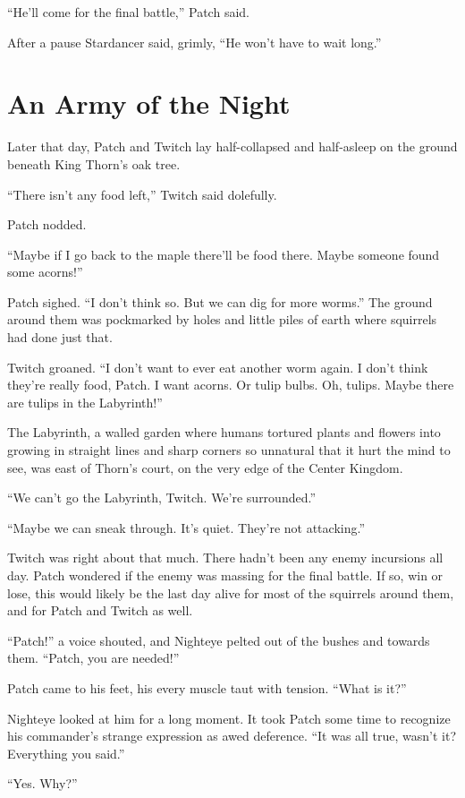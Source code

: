 \documentclass[12pt]{memoir}
\begin{document}
“He’ll come for the final battle,” Patch said.

After a pause Stardancer said, grimly, “He won’t have to wait long.”


\section{An Army of the Night}

Later that day, Patch and Twitch lay half-collapsed and half-asleep on
the ground beneath King Thorn’s oak tree.

“There isn’t any food left,” Twitch said dolefully.

Patch nodded.

“Maybe if I go back to the maple there’ll be food there. Maybe someone
found some acorns!”

Patch sighed. “I don’t think so. But we can dig for more worms.” The
ground around them was pockmarked by holes and little piles of earth
where squirrels had done just that.

Twitch groaned. “I don’t want to ever eat another worm again. I don’t
think they’re really food, Patch. I want acorns. Or tulip bulbs. Oh,
tulips. Maybe there are tulips in the Labyrinth!”

The Labyrinth, a walled garden where humans tortured plants and
flowers into growing in straight lines and sharp corners so unnatural
that it hurt the mind to see, was east of Thorn’s court, on the very
edge of the Center Kingdom.

“We can’t go the Labyrinth, Twitch. We’re surrounded.”

“Maybe we can sneak through. It’s quiet. They’re not attacking.”

Twitch was right about that much. There hadn’t been any enemy
incursions all day. Patch wondered if the enemy was massing for the
final battle. If so, win or lose, this would likely be the last day
alive for most of the squirrels around them, and for Patch and Twitch
as well.

“Patch!” a voice shouted, and Nighteye pelted out of the bushes and
towards them. “Patch, you are needed!”

Patch came to his feet, his every muscle taut with tension. “What is
it?”

Nighteye looked at him for a long moment. It took Patch some time to
recognize his commander’s strange expression as awed deference. “It
was all true, wasn’t it? Everything you said.”

“Yes. Why?”
\end{document}
